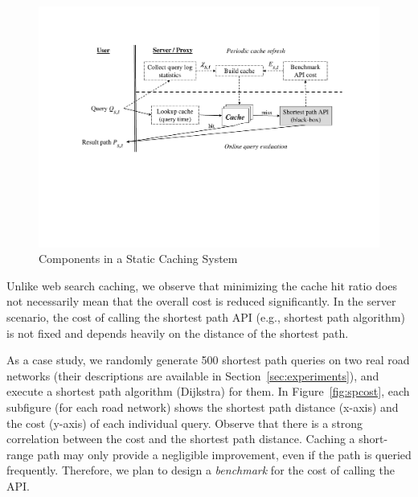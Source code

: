 \documentclass{sig-alternate}
\begin{document}
\begin{figure}[hbt]
  \center
        \includegraphics[width=1.0\columnwidth]{figures/routequery}
        \caption{Components in a Static Caching System}
  \label{fig:routequery}
\end{figure}










Unlike web search caching, we observe that
minimizing the cache hit ratio does not necessarily mean that the overall cost is reduced significantly.
In the server scenario, the cost of calling the shortest path API (e.g., shortest path algorithm) is not fixed
and depends heavily on the distance of the shortest path.


As a case study, we randomly generate 500 shortest path queries on two real road networks
(their descriptions are available in Section~\ref{sec:experiments}),
and execute a shortest path algorithm (Dijkstra) for them.
In Figure~\ref{fig:spcost}, each subfigure (for each road network) shows the shortest path distance (x-axis)
and the cost (y-axis) of each individual query.
Observe that there is a strong correlation between the cost and the shortest path distance.
%
Caching a short-range path may only provide a negligible improvement, even if the path is queried frequently.
Therefore, we plan to design a {\em benchmark} for the cost of calling the API.
\end{document}

